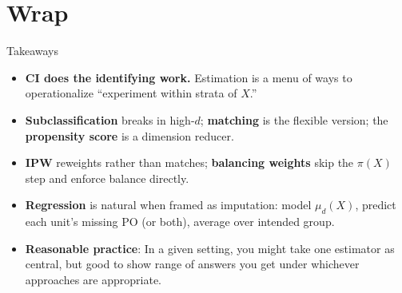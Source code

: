 \documentclass[xcolor=dvipsnames]{beamer}
\begin{document}
\section{Wrap}

\begin{frame}{Takeaways}
\small
\begin{itemize}
\item<1-> \textbf{CI does the identifying work.}  Estimation is a menu of ways to operationalize ``experiment within strata of $X$.''
\medskip
\item<2-> \textbf{Subclassification} breaks in high-$d$; \textbf{matching} is the flexible version; the \textbf{propensity score} is a dimension reducer.
\medskip
\item<3-> \textbf{IPW} reweights rather than matches; \textbf{balancing weights} skip the $\pi(X)$ step and enforce balance directly.
\medskip
\item<4-> \textbf{Regression} is natural when framed as imputation: model $\mu_d(X)$, predict each unit's missing PO (or both), average over intended group.
\medskip
\item<5-> \textbf{Reasonable practice}: In a given setting, you might take one estimator as central, but good to show range of answers you get under whichever approaches are appropriate. 
\end{itemize}
\end{frame}
\end{document}
